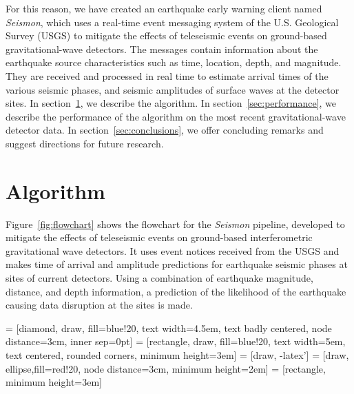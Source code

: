 \documentclass[twocolumn, aps, superscriptaddress]{revtex4}
\begin{document}
For this reason, we have created an earthquake early warning client named \emph{Seismon}, which uses a real-time event messaging system of the U.S. Geological Survey (USGS) to mitigate the effects of teleseismic events on ground-based gravitational-wave detectors. The messages contain information about the earthquake source characteristics such as time, location, depth, and magnitude. They are received and processed in real time to estimate arrival times of the various seismic phases, and seismic amplitudes of surface waves at the detector sites.
In section~\ref{sec:algorithm}, we describe the algorithm.
In section~\ref{sec:performance}, we describe the performance of the algorithm on the most recent gravitational-wave detector data.
In section~\ref{sec:conclusions}, we offer concluding remarks and suggest directions for future research.

\section{Algorithm}
\label{sec:algorithm}

Figure~\ref{fig:flowchart} shows the flowchart for the \emph{Seismon} pipeline, developed to mitigate the effects of teleseismic events on ground-based interferometric gravitational wave detectors. It uses event notices received from the USGS and makes time of arrival and amplitude predictions for earthquake seismic phases at sites of current detectors. Using a combination of earthquake magnitude, distance, and depth information, a prediction of the likelihood of the earthquake causing data disruption at the sites is made.

 = [diamond, draw, fill=blue!20,
    text width=4.5em, text badly centered, node distance=3cm, inner sep=0pt]
 = [rectangle, draw, fill=blue!20,
    text width=5em, text centered, rounded corners, minimum height=3em]
 = [draw, -latex']
 = [draw, ellipse,fill=red!20, node distance=3cm,
    minimum height=2em]
 = [rectangle, minimum height=3em]
\end{document}
